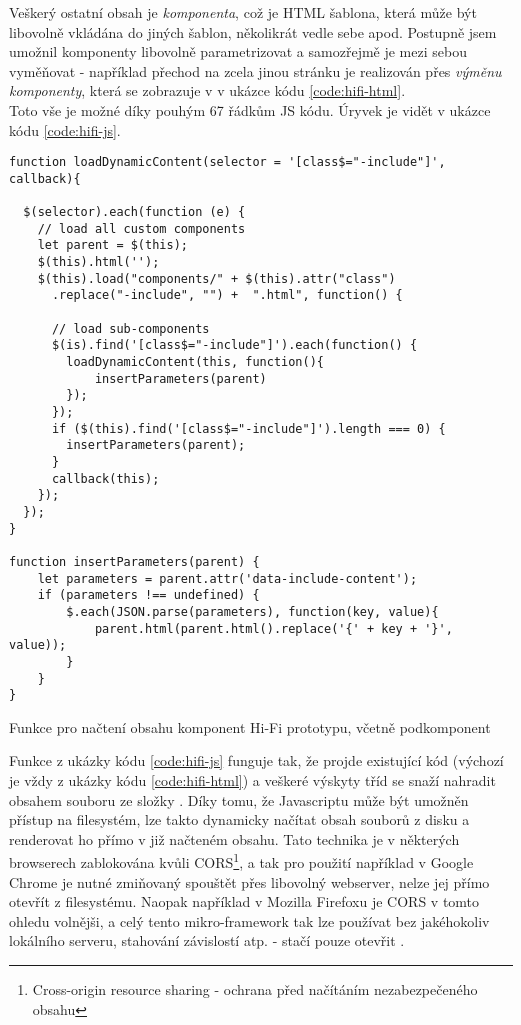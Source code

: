 Veškerý ostatní obsah je \emph{komponenta}, což je HTML šablona, která může být libovolně vkládána do jiných šablon, několikrát vedle sebe apod. Postupně jsem umožnil komponenty libovolně parametrizovat a samozřejmě je mezi sebou vyměňovat - například přechod na zcela jinou stránku je realizován přes \emph{výměnu komponenty}, která se zobrazuje v  v ukázce kódu \ref{code:hifi-html}.\\
Toto vše je možné díky pouhým 67 řádkům JS kódu. Úryvek je vidět v ukázce kódu \ref{code:hifi-js}.

\begin{listing}[H]
\begin{verbatim}
function loadDynamicContent(selector = '[class$="-include"]', callback){

  $(selector).each(function (e) {
    // load all custom components
    let parent = $(this);
    $(this).html('');
    $(this).load("components/" + $(this).attr("class")
      .replace("-include", "") +  ".html", function() {

      // load sub-components
      $(is).find('[class$="-include"]').each(function() {
        loadDynamicContent(this, function(){
            insertParameters(parent)
        });
      });
      if ($(this).find('[class$="-include"]').length === 0) {
        insertParameters(parent);
      }
      callback(this);
    });
  });
}

function insertParameters(parent) {
    let parameters = parent.attr('data-include-content');
    if (parameters !== undefined) {
        $.each(JSON.parse(parameters), function(key, value){
            parent.html(parent.html().replace('{' + key + '}', value));
        }
    }
}
\end{verbatim}
\caption{Funkce pro načtení obsahu komponent Hi-Fi prototypu, včetně podkomponent} \label{code:hifi-js}
\end{listing}

Funkce  z ukázky kódu \ref{code:hifi-js} funguje tak, že projde existující kód (výchozí je vždy  z ukázky kódu \ref{code:hifi-html}) a veškeré výskyty tříd  se snaží nahradit obsahem souboru  ze složky . Díky tomu, že Javascriptu může být umožněn přístup na filesystém, lze takto dynamicky načítat obsah souborů z disku a renderovat ho přímo v již načteném obsahu. Tato technika je v některých browserech zablokována kvůli CORS\footnote{Cross-origin resource sharing - ochrana před načítáním nezabezpečeného obsahu}, a tak pro použití například v Google Chrome je nutné zmiňovaný  spouštět přes libovolný webserver, nelze jej přímo otevřít z filesystému. Naopak například v Mozilla Firefoxu je CORS v tomto ohledu volnějši, a celý tento mikro-framework tak lze používat bez jakéhokoliv lokálního serveru, stahování závislostí atp. - stačí pouze otevřit .
